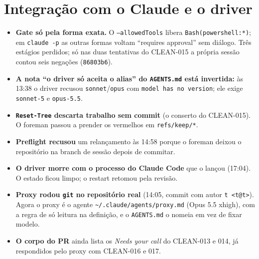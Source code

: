\documentclass[11pt,a4paper]{article}
\begin{document}
\section{Integração com o Claude e o driver}
\begin{itemize}
  \item \textbf{Gate só pela forma exata.} O \texttt{--allowedTools} libera
        \texttt{Bash(powershell:*)}; em \texttt{claude -p} as outras formas
        voltam ``requires approval'' sem diálogo. Três estágios perdidos; só
        nas duas tentativas do CLEAN-015 a própria sessão contou seis negações
        (\texttt{86803b6}).
  \item \textbf{A nota ``o driver só aceita o alias'' do \texttt{AGENTS.md}
        está invertida:} às 13:38 o driver recusou \texttt{sonnet}/\texttt{opus}
        com \texttt{model has no version}; ele exige \texttt{sonnet-5} e
        \texttt{opus-5.5}.
  \item \textbf{\texttt{Reset-Tree} descarta trabalho sem commit} (o conserto
        do CLEAN-015). O foreman passou a prender os vermelhos em
        \texttt{refs/keep/*}.
  \item \textbf{Preflight recusou} um relançamento às 14:58 porque o foreman
        deixou o repositório na branch de sessão depois de commitar.
  \item \textbf{O driver morre com o processo do Claude Code} que o lançou
        (17:04). O estado ficou limpo; o restart retomou pela revisão.
  \item \textbf{Proxy rodou \texttt{git} no repositório real} (14:05, commit com
        autor \texttt{t <t@t>}). Agora o proxy é o agente
        \texttt{\textasciitilde/.claude/agents/proxy.md} (Opus 5.5 xhigh), com
        a regra de só leitura na definição, e o \texttt{AGENTS.md} o nomeia em
        vez de fixar modelo.
  \item \textbf{O corpo do PR} ainda lista os \emph{Needs your call} do
        CLEAN-013 e 014, já respondidos pelo proxy com CLEAN-016 e 017.
\end{itemize}
\end{document}
